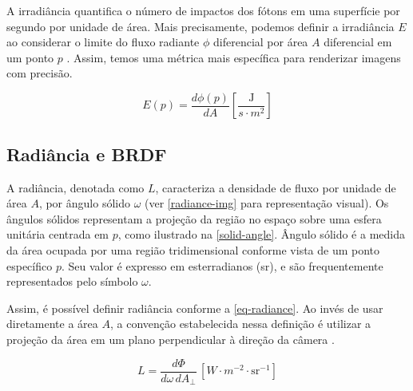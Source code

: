 \documentclass[english, 
               brazil, 
               bsc] %
               {dcomp-abntex2}
\begin{document}
A irradiância quantifica o número de impactos dos fótons em uma superfície por segundo por unidade de área. Mais precisamente, podemos definir a irradiância $E$ ao considerar o limite do fluxo radiante $\phi$ diferencial por área $A$ diferencial em um ponto $p$ \cite[~5.4.1]{pbr}. Assim, temos uma métrica mais específica para renderizar imagens com precisão.


$$
 E(p) = \frac{d\phi(p)}{dA} \left[ \frac{\text{J}} {s\cdot m^2} \right]
$$




\subsection{Radiância e BRDF} \label{brdf}


A radiância,  denotada como \( L \), caracteriza a densidade de fluxo por unidade de área \( A \), por ângulo sólido \(\omega \) (ver \autoref{radiance-img} para representação visual). Os ângulos sólidos representam a projeção da região no espaço sobre uma esfera unitária centrada em \( p \), como ilustrado na \autoref{solid-angle}. Ângulo sólido é a medida da área ocupada por uma região tridimensional conforme vista de um ponto específico \( p \). Seu valor é expresso em esterradianos (sr), e são frequentemente representados pelo símbolo \( \omega \).


Assim, é possível definir radiância conforme a \autoref{eq-radiance}. Ao invés de usar diretamente a área \( A \), a convenção estabelecida nessa definição é utilizar a projeção da área em um plano perpendicular à direção da câmera \cite{weyrich}.


\begin{equation} \label{eq-radiance}
  L = \frac{d\Phi}{d\omega \, dA_\perp} \, \left[W \cdot m^{-2} \cdot \text{sr}^{-1}\right]
\end{equation}
\end{document}
